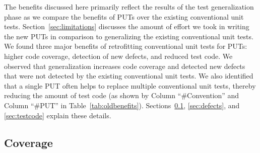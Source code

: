 The benefits discussed here primarily reflect the results of the test generalization phase as we compare the benefits of PUTs over the existing conventional unit tests. Section~\ref{sec:limitations} discusses the amount of effort we took in writing the new PUTs in comparison to generalizing the existing conventional unit tests. We found three major benefits of retrofitting conventional unit tests for PUTs: higher code coverage, detection of new defects, and reduced test code. We observed that generalization
increases code coverage and detected new defects that were not
detected by the existing conventional unit tests. 
We also identified that
a single PUT often helps to replace multiple conventional unit tests,
thereby reducing the amount of test code (as shown by Column ``\#Convention'' and Column ``\#PUT'' in Table~\ref{tab:oldbenefits}). Sections~\ref{sec:coverage}, \ref{sec:defects}, and \ref{sec:testcode} explain these details.
\subsection{Coverage}
\label{sec:coverage}

